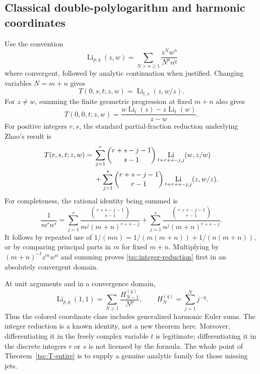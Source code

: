 \documentclass[11pt]{article}
\numberwithin{equation}{section}
\theoremstyle{definition}\newtheorem{definition}[theorem]{Definition}
\theoremstyle{remark}\newtheorem{remark}[theorem]{Remark}
\DeclareMathOperator{\Li}{Li}
\begin{document}
\subsection{Classical double-polylogarithm and harmonic coordinates}
Use the convention
\[
 \Li_{p,q}(z,w)=\sum_{N>n\ge1}\frac{z^Nw^n}{N^p n^q}
\]
where convergent, followed by analytic continuation when justified.
Changing variables $N=m+n$ gives
\begin{equation}\label{tsc:T-zero-first}
 T(0,s,t;z,w)=\Li_{t,s}(z,w/z).
\end{equation}
For $z\ne w$, summing the finite geometric progression at fixed $m+n$
also gives
\begin{equation}\label{tsc:T00}
 T(0,0,t;z,w)=\frac{w\Li_t(z)-z\Li_t(w)}{z-w}.
\end{equation}
For positive integers $r,s$, the standard partial-fraction reduction
underlying Zhao's result \cite{tsc:zhao} is
\begin{align}\label{tsc:integer-reduction}
 T(r,s,t;z,w)={}&\sum_{j=1}^r\binom{r+s-j-1}{s-1}
                     \Li_{t+r+s-j,j}(w,z/w)\notag\\
 &+\sum_{j=1}^s\binom{r+s-j-1}{r-1}
                     \Li_{t+r+s-j,j}(z,w/z).
\end{align}
For completeness, the rational identity being summed is
\[
 \frac1{m^r n^s}=
  \sum_{j=1}^r\frac{\binom{r+s-j-1}{s-1}}{m^j(m+n)^{r+s-j}}
 +\sum_{j=1}^s\frac{\binom{r+s-j-1}{r-1}}{n^j(m+n)^{r+s-j}}.
\]
It follows by repeated use of
$1/(mn)=1/(m(m+n))+1/(n(m+n))$, or by comparing principal parts in
$m$ for fixed $m+n$. Multiplying by $(m+n)^{-t}z^mw^n$ and summing proves
\eqref{tsc:integer-reduction} first in an absolutely convergent domain.

At unit arguments and in a convergence domain,
\[
 \Li_{p,q}(1,1)=\sum_{N\ge1}\frac{H_{N-1}^{(q)}}{N^p},
 \qquad H_N^{(q)}=\sum_{j=1}^N j^{-q}.
\]
Thus the colored coordinate class includes generalized harmonic Euler sums.
The integer reduction is a known identity, not a new theorem here.
Moreover, differentiating it in the freely complex variable $t$ is
legitimate; differentiating it in the discrete integers $r$ or $s$ is not
licensed by the formula. The whole point of Theorem~\ref{tsc:T-entire}
is to supply a genuine analytic family for those missing jets.


\end{document}

